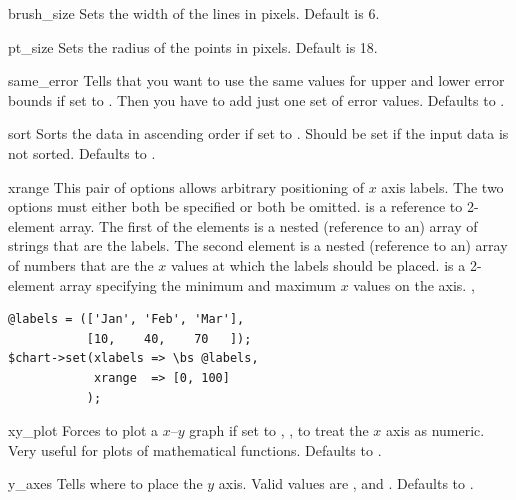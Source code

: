 \constructorblurb{\thisname}

\begin{AttrDecl}{brush\_size}
Sets the width of the lines in pixels. Default is 6.
\end{AttrDecl}

\begin{AttrDecl}{pt\_size}
Sets the radius of the points in pixels. Default is 18.
\end{AttrDecl}

\begin{AttrDecl}{same\_error}
Tells \thisclass that you want to use the same values for
upper and lower error bounds if set to . Then you have to
add just one set of error values. Defaults to .
\end{AttrDecl}

\begin{AttrDecl}{sort}
Sorts the data in ascending order if set to . Should be
set if the input data is not sorted. Defaults to .
\end{AttrDecl}

\begin{AttrDecl}{xrange}
This pair of options allows arbitrary positioning of $x$ axis labels.
The two options must either both be specified or both be omitted.
 is a reference to 2-element array. The first of the
elements is a nested (reference to an) array of strings that are the
labels. The second element is a nested (reference to an) array of
numbers that are the $x$ values at which the labels should be placed.
 is a 2-element array specifying the minimum and maximum
$x$ values on the axis. \Eg,
\begin{verbatim}
@labels = (['Jan', 'Feb', 'Mar'],
           [10,    40,    70   ]);
$chart->set(xlabels => \bs @labels,
            xrange  => [0, 100]
           );
\end{verbatim}
\end{AttrDecl}

\begin{AttrDecl}{xy\_plot}
Forces \thisclass to plot a $x$--$y$ graph if set to ,
\ie, to treat the $x$ axis as numeric. Very useful for plots of
mathematical functions. Defaults to .
\end{AttrDecl}

\begin{AttrDecl}{y\_axes}
Tells \thisclass where to place the $y$ axis. Valid values are
,  and . Defaults to
.
\end{AttrDecl}
